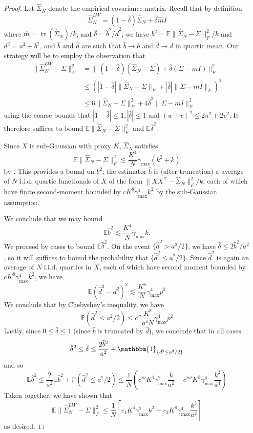 \documentclass{article} %
\newcommand{\p}{\mathbb{P}}
\newcommand{\Ex}{\mathbb{E}}
\DeclareMathOperator{\tr}{tr}
\newcommand{\I}{\mathbbm{1}}
\newcommand{\wh}[1]{\widehat{#1}}
\begin{document}
\begin{proof}
    Let $\wh{\Sigma}_N$ denote the empirical covariance matrix. Recall that by definition
    \[
    \wh{\Sigma}^{LW}_N = (1-\hat{\delta})\wh{\Sigma}_N +\hat{\delta} \hat{m}I
    \]
    where $\hat{m}=\tr(\wh{\Sigma}_N)/k$, and $\hat{\delta}=\hat{b}^2/\hat{d}^2$; we have $b^2= \Ex\|\wh{\Sigma}_N-\Sigma\|_F^2/k$ and $d^2=a^2+b^2$, and $\hat{b}$ and $\hat{d}$ are such that $\hat{b}\to b$ and $\hat{d}\to d$ in quartic mean. Our strategy will be to employ the observation that
    \begin{align*}
        \|\wh{\Sigma}_N^{LW}-\Sigma\|_F^2 &= \|(1-\hat{\delta})(\wh{\Sigma}_N-\Sigma)+\hat{\delta}(\Sigma-mI)\|_F^2 \\
        &\leq \left(|1-\hat{\delta}|\|\wh{\Sigma}_N-\Sigma\|_F + |\hat{\delta}|\|\Sigma-mI\|_F\right)^2 \\
        &\leq 6\|\wh{\Sigma}_N-\Sigma\|_F^2 + 4\hat{\delta}^2 \|\Sigma-mI\|_F^2
    \end{align*}
    using the coarse bounds that $|1-\hat{\delta}|\leq1,|\hat{\delta}|\leq1$ and $(u+v)^2\leq2u^2+2v^2$. It therefore suffices to bound $\Ex \|\wh{\Sigma}_N-\Sigma\|_F^2$ and $\Ex\hat{\delta}^2$.
    
    Since $X$ is sub-Gaussian with proxy $K$, $\wh{\Sigma}_N$ satisfies
    \[
    \Ex \|\wh{\Sigma}_N-\Sigma\|_F^2 \lesssim \frac{K^4}{N}\gamma_{\max}(k^2+k)
    \]
    by \citet{wainwright2019high}. This provides a bound on $b^2$; the estimator $\hat{b}$ is (after truncation) a average of $N$ i.i.d. quartic functionals of $X$ of the form $\|XX^\top-\wh{\Sigma}_N\|_F^2/k$, each of which have finite second-moment bounded by $cK^8\gamma_{\max}^4 k^2$ by the sub-Gaussian assumption.
    
    We conclude that we may bound
    \[
    \Ex \hat{b}^2 \lesssim \frac{K^4}{N}\gamma_{\max}k.
    \]
    We proceed by cases to bound $\Ex \hat{\delta}^2$. On the event $\{\hat{d}^2>a^2/2\}$, we have $\hat{\delta}\leq 2\hat{b}^2/a^2$, so it will suffices to bound the probability that $\{\hat{d}^2\leq a^2/2\}$. Since $\hat{d}^2$ is again an average of $N$ i.i.d. quartics in $X$, each of which have second moment bounded by $cK^8\gamma_{\max}^4k^2$, we have
    \[
    \Ex(\hat{d}^2-d^2)^2 \lesssim \frac{K^8}{N}\gamma_{\max}^4p^2
    \]
    We conclude that by Chebyshev's inequality, we have
    \[
    \p(\hat{d}^2\leq a^2/2) \leq c''\frac{K^8}{a^4N}\gamma_{\max}^4p^2
    \]
    Lastly, since $0\leq \hat{\delta}\leq 1$ (since $\hat{b}$ is truncated by $\hat{d}$), we conclude that in all cases
    \[
    \hat{\delta}^2\leq \hat{\delta} \leq \frac{2\hat{b}^2}{a^2} + \I_{\{\hat{d^2}\leq a^2/2\}}
    \]
    and so
    \[
    \Ex \hat{\delta}^2 \leq \frac{2}{a^2}\Ex \hat{b}^2 + \p(\hat{d}^2\leq a^2/2) \leq \frac{1}{N}\left(c'''K^4\gamma_{\max}^2\frac{k}{a^2} + c''''K^8\gamma_{\max}^4\frac{k^2}{a^4}\right)
    \]
    Taken together, we have shown that
    \[
    \Ex\|\wh{\Sigma}_N^{LW}-\Sigma\|_F^2 \leq \frac{1}{N}\left[c_1 K^4\gamma_{\max}^2k^2+c_2K^8\gamma_{\max}^4\frac{k^3}{a^2}\right]
    \]
    as desired.
\end{proof}
\end{document}

